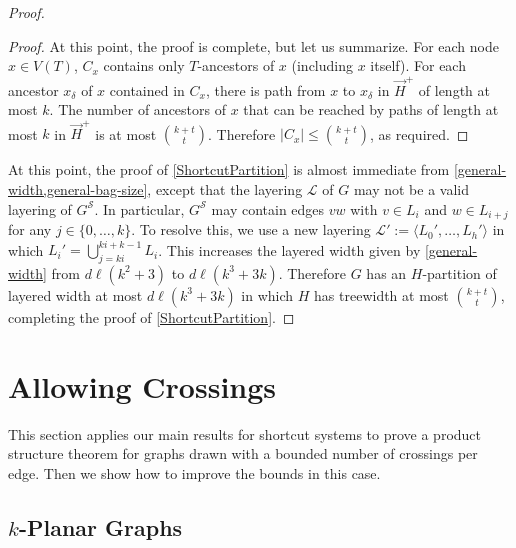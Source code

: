 \documentclass{patmorin}
\newcommand{\note}[2]{\noindent{\color{red}[#1:~#2]}}
\renewcommand{\SS}{\mathcal{S}}
\renewcommand{\le}{\leqslant}
\begin{document}
\begin{proof}
\begin{proof}


  At this point, the proof is complete, but let us summarize. For each node $x\in V(T)$, $C_x$ contains only $T$-ancestors of $x$ (including $x$ itself).  For each ancestor $x_\delta$ of $x$ contained in $C_x$, there is path from $x$ to $x_\delta$ in $\overrightarrow{H}^+$ of length at most $k$.  The number of ancestors of $x$ that can be reached by paths of length at most $k$ in $\overrightarrow{H}^+$ is at most $\binom{k+t}{t}$.  Therefore $|C_x|\le \binom{k+t}{t}$, as required.
\end{proof}

At this point, the proof of \cref{ShortcutPartition} is almost immediate from \cref{general-width,general-bag-size}, except that the layering $\mathcal{L}$ of $G$ may not be a valid layering of $G^{\SS}$.  In particular, $G^{\SS}$ may contain edges $vw$ with $v\in L_i$ and $w\in L_{i+j}$ for any $j\in\{0,\ldots,k\}$.  To resolve this, we use a new layering $\mathcal{L}':=\langle L_0',\ldots,L_h'\rangle$ in which $L_i'=\bigcup_{j=ki}^{ki+k-1} L_i$.  This increases the layered width given by \cref{general-width} from $d\ell(k^2+3)$ to $d\ell(k^3+3k)$.  Therefore $G$ has an $H$-partition of layered width at most $d\ell(k^3+3k)$ in which $H$ has treewidth at most $\binom{k+t}{t}$, completing the proof of \cref{ShortcutPartition}.
\end{proof}

\section{Allowing Crossings}
\label{sec-k-planar}

This section applies our main results for shortcut systems to prove a product structure theorem for graphs drawn with a bounded number of crossings per edge. Then we show how to improve the bounds in this case.

\subsection{$k$-Planar Graphs}
\end{document}
